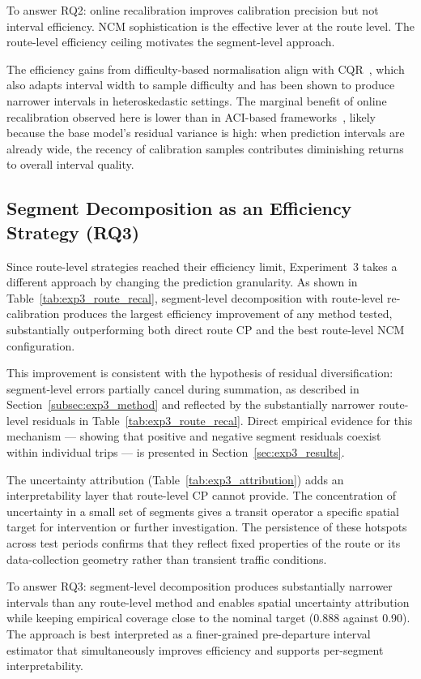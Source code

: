 \documentclass[12pt, a4paper, oneside]{report}
\begin{document}
To answer RQ2: online recalibration improves calibration precision but not interval efficiency. NCM sophistication is the effective lever at the route level. The route-level efficiency ceiling motivates the segment-level approach.

The efficiency gains from difficulty-based normalisation align with CQR~\cite{Romano2019}, which also adapts interval width to sample difficulty and has been shown to produce narrower intervals in heteroskedastic settings. The marginal benefit of online recalibration observed here is lower than in ACI-based frameworks~\cite{Zaffran202225834}, likely because the base model's residual variance is high: when prediction intervals are already wide, the recency of calibration samples contributes diminishing returns to overall interval quality.

\subsection{Segment Decomposition as an Efficiency Strategy (RQ3)}

Since route-level strategies reached their efficiency limit, Experiment~3 takes a different approach by changing the prediction granularity. As shown in Table~\ref{tab:exp3_route_recal}, segment-level decomposition with route-level re-calibration produces the largest efficiency improvement of any method tested, substantially outperforming both direct route CP and the best route-level NCM configuration.

This improvement is consistent with the hypothesis of residual diversification: segment-level errors partially cancel during summation, as described in Section~\ref{subsec:exp3_method} and reflected by the substantially narrower route-level residuals in Table~\ref{tab:exp3_route_recal}. Direct empirical evidence for this mechanism --- showing that positive and negative segment residuals coexist within individual trips --- is presented in Section~\ref{sec:exp3_results}.

The uncertainty attribution (Table~\ref{tab:exp3_attribution}) adds an interpretability layer that route-level CP cannot provide. The concentration of uncertainty in a small set of segments gives a transit operator a specific spatial target for intervention or further investigation. The persistence of these hotspots across test periods confirms that they reflect fixed properties of the route or its data-collection geometry rather than transient traffic conditions.

To answer RQ3: segment-level decomposition produces substantially narrower intervals than any route-level method and enables spatial uncertainty attribution while keeping empirical coverage close to the nominal target (0.888 against 0.90). The approach is best interpreted as a finer-grained pre-departure interval estimator that simultaneously improves efficiency and supports per-segment interpretability.
\end{document}
